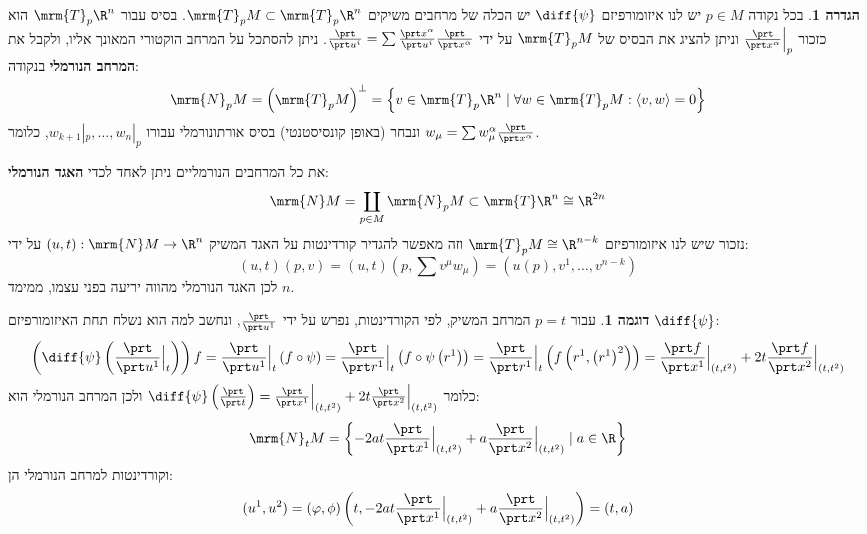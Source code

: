 \documentclass{article}
\theoremstyle{definition}
\newtheorem*{definition*}{הגדרה}
\newtheorem*{example*}{דוגמה}
\begin{document}
	\begin{definition*}
		בכל נקודה
		$p\in M$
		יש לנו איזומורפיזם
		\(\diff{\psi}\)
		יש הכלה של מרחבים משיקים
		\(\mrm{T}_p M \subset \mrm{T}_p \R^n\).
		בסיס עבור
		\(\mrm{T}_p \R^n\)
		הוא כזכור
		\(\frac{\prt}{\prt x^\alpha}\Big|_p\)
		וניתן להציג את הבסיס של
		\(\mrm{T}_p M\)
		על ידי
		\(\frac{\prt}{\prt u^i} = \sum \frac{\prt x^\alpha}{\prt u^i} \frac{\prt}{\prt x^\alpha}\).
		ניתן להסתכל על המרחב הוקטורי המאונך אליו, ולקבל את \textbf{המרחב הנורמלי} בנקודה:
		\[
			\mrm{N}_p M
			= \left(\mrm{T}_p M\right)^\bot
			= \left\{
				v \in \mrm{T}_p \R^n
				\mid
				\forall w \in \mrm{T}_p M: \langle v,w \rangle=0
			\right\}
		\]
		ונבחר (באופן קונסיסטנטי) בסיס אורתונורמלי עבורו
		\(w_{k+1}|_p,\dotsc,w_{n}|_p\),
		כלומר
		\(w_\mu=\sum w_\mu^\alpha \frac{\prt}{\prt x^\alpha}\).
		
		את כל המרחבים הנורמליים ניתן לאחד לכדי \textbf{האגד הנורמלי}:
		\[
			\mrm{N} M
			= \coprod_{p \in M} \mrm{N}_p M
			\subset \mrm{T} \R^n
			\cong \R^{2n}
		\]
		נזכור שיש לנו איזומורפיזם
		\(\mrm{T}_p M \cong \R^{n-k}\)
		וזה מאפשר להגדיר קורדינטות על האגד המשיק
		\((u,t): \mrm{N} M \to \R^n\)
		על ידי:
		\[
		(u,t)(p,v)
		= (u,t)(p,\sum v^\mu w_\mu)
		= (u(p),v^1,\dotsc,v^{n-k})
		\]
		לכן האגד הנורמלי מהווה יריעה בפני עצמו, ממימד \(n\).
	\end{definition*}

	\begin{example*}
		עבור
		\(p=t\)
		המרחב המשיק, לפי הקורדינטות, נפרש על ידי
		\(\frac{\prt}{\prt u^1}\),
		ונחשב למה הוא נשלח תחת האיזומורפיזם
		\(\diff{\psi}\):
		\[
			\left(\diff{\psi}\left(\frac{\prt}{\prt u^1}\Big|_t\right)\right)f
			=\frac{\prt}{\prt u^1}\Big|_t\left(f\circ\psi\right)
			=\frac{\prt}{\prt r^1}\Big|_t\left(f\circ\psi\left(r^1\right)\right)
			=\frac{\prt}{\prt r^1}\Big|_t\left(f\left(r^1,\left(r^1\right)^2\right)\right)
			=\frac{\prt f}{\prt x^1}\Big|_{(t,t^2)}+2t\frac{\prt f}{\prt x^2}\Big|_{(t,t^2)}
		\]
		כלומר
		\(
			\diff{\psi}\left(\frac{\prt}{\prt t}\right)
			=\frac{\prt}{\prt x^1}\Big|_{(t,t^2)}+2t\frac{\prt}{\prt x^2}\Big|_{(t,t^2)}
		\)
		ולכן המרחב הנורמלי הוא:
		\[
			\mrm{N}_t M
			= \left\{
				-2at\frac{\prt}{\prt x^1}\Big|_{(t,t^2)}+a\frac{\prt}{\prt x^2}\Big|_{(t,t^2)}
				\mid
				a \in \R
			\right\}
		\]
		וקורדינטות למרחב הנורמלי הן:
		\[
			(u^1,u^2)
			=\left(\varphi,\phi\right)\left(t,-2at\frac{\prt}{\prt x^1}\Big|_{(t,t^2)}+a\frac{\prt}{\prt x^2}\Big|_{(t,t^2)}\right)
			=(t,a)
		\]
	\end{example*}
\end{document}
